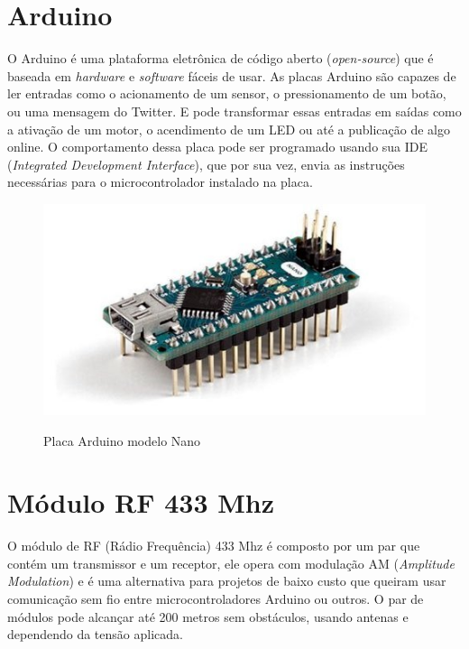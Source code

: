 \documentclass[
	12pt,				%
	openright,			%
	oneside,			%
	a4paper,			%
	english,			%
	brazil				%
	]{abntex2}
\begin{document}
		\section{Arduino}
		O Arduino é uma plataforma eletrônica de código aberto (\textit{open-source}) que é baseada em \textit{hardware} e \textit{software} fáceis de usar. As placas Arduino são capazes de ler entradas como o acionamento de um sensor, o pressionamento de um botão, ou uma mensagem do Twitter. E pode transformar essas entradas em saídas como a ativação de um motor, o acendimento de um LED ou até a publicação de algo online. O comportamento dessa placa pode ser programado usando sua IDE (\textit{Integrated Development Interface}), que por sua vez, envia as instruções necessárias para o microcontrolador instalado na placa.\cite{arduinosite}
		
		\begin{figure}[h!]
			\centering
			\caption{Placa Arduino modelo Nano \cite{arduinonanosite}}
  		\includegraphics[scale=0.7]{./figures/arduino-nano1.jpg}
  		\label{Fig:arduino-nano1}
		\end{figure}

		\section{Módulo RF 433 Mhz}
		O módulo de RF (Rádio Frequência) 433 Mhz é composto por um par que contém um transmissor e um receptor, ele opera com modulação AM (\textit{Amplitude Modulation}) e é uma alternativa para projetos de baixo custo que queiram usar comunicação sem fio entre microcontroladores Arduino ou outros. O par de módulos pode alcançar até 200 metros sem obstáculos, usando antenas e dependendo da tensão aplicada.\cite{institutodigitalrf}


	
\end{document}
